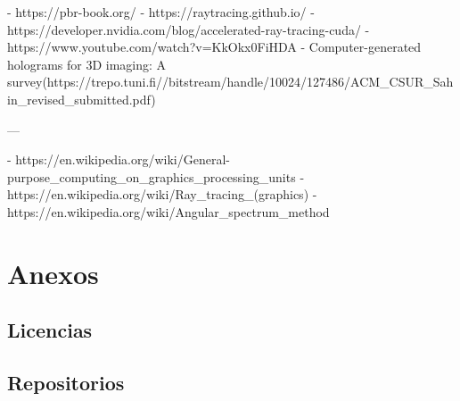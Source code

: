 \documentclass[10pt, a4paper]{article}
\begin{document}
- https://pbr-book.org/
- https://raytracing.github.io/
- https://developer.nvidia.com/blog/accelerated-ray-tracing-cuda/
- https://www.youtube.com/watch?v=KkOkx0FiHDA
- Computer-generated holograms for 3D imaging: A survey(https://trepo.tuni.fi//bitstream/handle/10024/127486/ACM_CSUR_Sahin_revised_submitted.pdf)

---

- https://en.wikipedia.org/wiki/General-purpose_computing_on_graphics_processing_units
- https://en.wikipedia.org/wiki/Ray_tracing_(graphics)
- https://en.wikipedia.org/wiki/Angular_spectrum_method

\printbibliography[heading=bibintoc]

\section{Anexos}

\subsection{Licencias}

\subsection{Repositorios}
\end{document}
